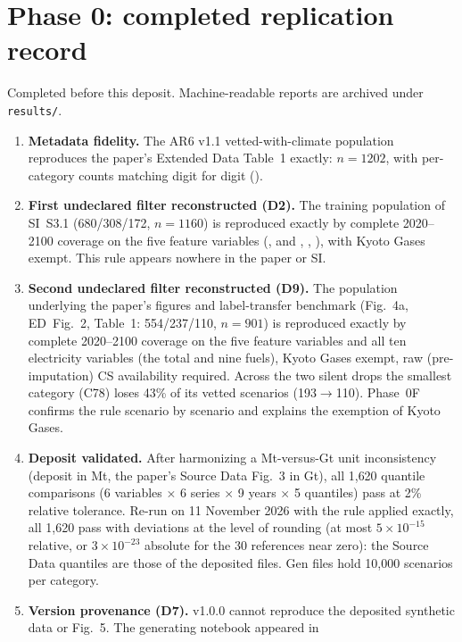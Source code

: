 \documentclass[11pt,a4paper]{article}
\newcommand{\prop}[1]{#1}
\newcommand{\prop}[1]{\textcolor{blue}{#1}}
\begin{document}
\section{Phase 0: completed replication record}\label{sec:phase0}
Completed before this deposit. Machine-readable reports are archived under
\texttt{results/}.
\begin{enumerate}[nosep]
\item \textbf{Metadata fidelity.} The AR6 v1.1 vetted-with-climate
  population reproduces the paper's Extended Data Table~1 exactly: $n=1202$,
  with per-category counts matching digit for digit
  ().
\item \textbf{First undeclared filter reconstructed (D2).} The training
  population of SI~S3.1 (680/308/172, $n=1160$) is reproduced exactly by
  complete 2020--2100 coverage on the five feature variables
  (,  and ,
  , ), with Kyoto
  Gases exempt. This rule appears nowhere in the paper or SI.
\item \textbf{Second undeclared filter reconstructed (D9).} The population
  underlying the paper's figures and label-transfer benchmark (Fig.~4a,
  ED~Fig.~2, Table~1: 554/237/110, $n=901$) is reproduced exactly by
  complete 2020--2100 coverage on the five feature variables and all ten
  electricity variables (the total and nine fuels), Kyoto Gases exempt, raw
  (pre-imputation) CS availability required. Across the two silent drops
  the smallest category (C78) loses 43\% of its vetted scenarios
  (193$\to$110). \prop{Phase~0F confirms the rule scenario by scenario and
  explains the exemption of Kyoto Gases.}
\item \textbf{Deposit validated.} After harmonizing a Mt-versus-Gt unit
  inconsistency (deposit in Mt, the paper's Source Data Fig.~3 in Gt), all
  1{,}620 quantile comparisons (6 variables $\times$ 6 series $\times$ 9
  years $\times$ 5 quantiles) pass at 2\% relative tolerance.
  \prop{Re-run on 11 November 2026 with the rule applied exactly, all
  1{,}620 pass with deviations at the level of rounding (at most
  $5\times10^{-15}$ relative, or $3\times10^{-23}$ absolute for the 30
  references near zero): the Source Data quantiles are those of the
  deposited files.}
  Gen files hold 10{,}000 scenarios per category.
\item \textbf{Version provenance (D7).} v1.0.0 cannot reproduce the
  deposited synthetic data or Fig.~5. The generating notebook appeared in

\end{enumerate}
\end{document}
